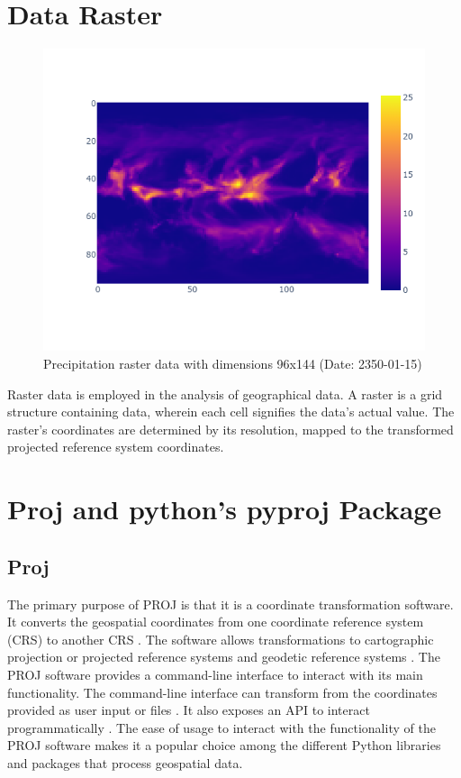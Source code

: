 \section{Data Raster}
\begin{figure}[h]
    \centering
    \includegraphics[width=0.75\linewidth]{figures/chapter-5/precipitation_raster.png}
    \caption{Precipitation raster data with dimensions 96x144 (Date: 2350-01-15)}
    \label{fig:precipitation-raster}
\end{figure}
Raster data is employed in the analysis of geographical data. A raster is a grid structure containing data, wherein each cell signifies the data's actual value. The raster's coordinates are determined by its resolution, mapped to the transformed projected reference system coordinates.


\section{Proj and python's pyproj Package}
\label{section:proj}

\subsection{Proj}

The primary purpose of PROJ is that it is a coordinate transformation
software. It converts the geospatial coordinates from one coordinate reference system (CRS) to another CRS \cite{PROJ_SITE}.
The software allows transformations to cartographic projection or projected reference systems and geodetic reference systems \cite{PROJ_SITE}.
The PROJ software provides a command-line interface to interact with its main functionality\cite{PROJ_SITE}.
The command-line interface can transform from the coordinates provided as user input or files \cite{PROJ_SITE}.
It also exposes an API to interact programmatically \cite{PROJ_SITE}. The ease of usage to interact with the functionality of the PROJ software makes it a popular choice among the different Python libraries and packages that process geospatial data.

